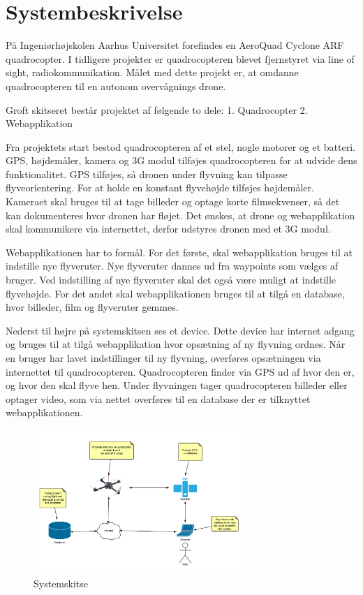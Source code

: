 \chapter{Systembeskrivelse}

\vspace{-20pt}

På Ingeniørhøjskolen Aarhus Universitet forefindes en AeroQuad Cyclone ARF quadrocopter. I tidligere projekter er quadrocopteren blevet fjernstyret via line of sight, radiokommunikation. Målet med dette projekt er, at omdanne quadrocopteren til en autonom overvågnings drone.

Groft skitseret består projektet af følgende to dele: 
1. Quadrocopter
2. Webapplikation

Fra projektets start bestod quadrocopteren af et stel, nogle motorer og et batteri. GPS, højdemåler, kamera og 3G modul tilføjes quadrocopteren for at udvide dens funktionalitet. GPS tilføjes, så dronen under flyvning kan tilpasse flyveorientering. For at holde en konstant flyvehøjde tilføjes højdemåler. Kameraet skal bruges til at tage billeder og optage korte filmsekvenser, så det kan dokumenteres hvor dronen har fløjet. Det ønskes, at drone og webapplikation skal kommunikere via internettet, derfor udstyres dronen med et 3G modul.

Webapplikationen har to formål. For det første, skal webapplikation bruges til at indstille nye flyveruter. Nye flyveruter dannes ud fra waypoints som vælges af bruger. Ved indstilling af nye flyveruter skal det også være muligt at indstille flyvehøjde. For det andet skal webapplikationen bruges til at tilgå en database, hvor billeder, film og flyveruter gemmes.

Nederst til højre på systemskitsen ses et device. Dette device har internet adgang og bruges til at tilgå webapplikation hvor opsætning af ny flyvning ordnes.  Når en bruger har lavet indstillinger til ny flyvning, overføres opsætningen via internettet til quadrocopteren. Quadrocopteren finder via GPS ud af hvor den er, og hvor den skal flyve hen. Under flyvningen tager quadrocopteren billeder eller optager video, som via nettet overføres til en database der er tilknyttet webapplikationen.

\vspace{-5pt}
\begin{figure}[H]
\centering
\includegraphics[width=0.7\textwidth]{Billeder/Projektbeskrivelse.png}
\vspace{-5pt}
\caption{Systemskitse}
\label{fig:Systemskitse}
\end{figure}